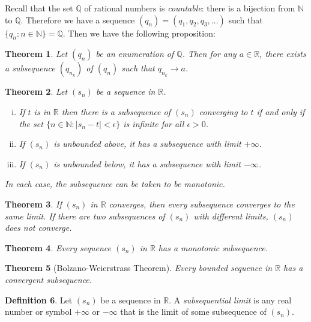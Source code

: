 \documentclass[12pt, lettersize]{book}
\theoremstyle{plain}
\newtheorem{thm}{Theorem}[section]
\theoremstyle{definition}
\newtheorem{dfn}[thm]{Definition}
\theoremstyle{remark}
\newcommand{\R}{\mathbb{R}}
\newcommand{\N}{\mathbb{N}}
\newcommand{\Q}{\mathbb{Q}}
\begin{document}
		Recall that the set $\Q$ of rational numbers is \emph{countable}: there is a bijection from $\N$ to $\Q$. Therefore we have a sequence $(q_n)=(q_1,q_2,q_3,\dots)$ such that $\{q_n: n\in\N\}=\Q$. Then we have the following proposition:
		\begin{thm}
			Let $(q_n)$ be an enumeration of $\Q$. Then for any $a\in\R$, there exists a subsequence $(q_{n_k})$ of $(q_n)$ such that $q_{n_k}\rightarrow a$.
		\end{thm}
	
		\setcounter{equation}{0}
		\begin{thm}\label{def:limit-subseq}
			Let $(s_n)$ be a sequence in $\R$.
			\begin{enumerate}[(i)]
				\item If $t$ is in $\mathbb{R}$ then there is a subsequence of $(s_n)$ converging to $t$ if and only if
				the set $\{n\in\mathbb{N}: |s_n-t|<\epsilon\}$ is \emph{infinite} for all $\epsilon>0$.
				\item If $(s_n)$ is unbounded above, it has a subsequence with limit $+\infty$.
				\item If $(s_n)$ is unbounded below, it has a subsequence with limit $-\infty$.
			\end{enumerate}
			In each case, the subsequence can be taken to be \emph{monotonic}.
		\end{thm}
		
		\begin{thm}\label{def:subsequence converges to the same limit}
			If $(s_n)$ in $\R$ converges, then every subsequence converges to the same limit. If there are two subsequences of $(s_n)$ with different limits, $(s_n)$ does not converge.
		\end{thm}
		
		\begin{thm}
			Every sequence $(s_n)$ in $\R$ has a monotonic subsequence.
		\end{thm}
		\setcounter{equation}{0}
		
		\begin{thm}[Bolzano-Weierstrass Theorem]\label{def:B-W}
			Every bounded sequence in $\R$ has a convergent subsequence.
		\end{thm}
		
		\begin{dfn}
			Let $(s_n)$ be a sequence in $\mathbb{R}$. A \emph{subsequential limit} is any real number or symbol $+\infty$ or $-\infty$ that is the limit of some subsequence of $(s_n)$.
		\end{dfn}
		
\end{document}
